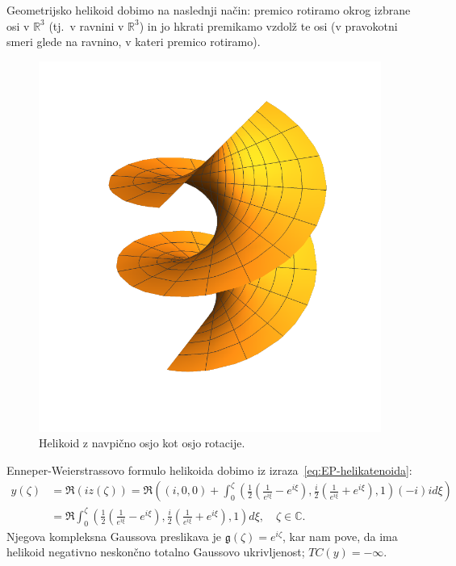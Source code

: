 \documentclass[12pt,a4paper,twoside]{article}
\theoremstyle{definition} %
\theoremstyle{plain} %
\numberwithin{equation}{section}  %
\begin{document}
Geometrijsko helikoid dobimo na naslednji način: premico rotiramo okrog izbrane osi v $\mathbb{R}^3$ (tj.~v ravnini v $\mathbb{R}^3$) in jo hkrati premikamo vzdolž te osi (v pravokotni smeri glede na ravnino, v kateri premico rotiramo).

\begin{figure}[h!]
\begin{center}
\includegraphics[scale=0.8]{images/helicoid.pdf}
\caption{Helikoid z navpično osjo kot osjo rotacije.}
\end{center}
\end{figure}

Enneper-Weierstrassovo formulo helikoida dobimo iz izraza~\eqref{eq:EP-helikatenoida}:
\begin{align}
y(\zeta) &= \Re (iz(\zeta)) = \Re \left( (i,0,0) + \int_{0}^{\zeta} \left( \frac{1}{2} \left(\frac{1}{e^{i\xi}} - e^{i\xi} \right), \frac{i}{2} \left(\frac{1}{e^{i\xi}} + e^{i\xi} \right), 1 \right) (-i) i d\xi \right) \nonumber \\
	&= \Re \int_{0}^{\zeta} \left( \frac{1}{2} \left(\frac{1}{e^{i\xi}} - e^{i\xi} \right), \frac{i}{2} \left(\frac{1}{e^{i\xi}} + e^{i\xi} \right), 1 \right) d\xi, \quad \zeta \in \mathbb{C}.
\end{align}
Njegova kompleksna Gaussova preslikava je $\mathfrak{g}(\zeta) = e^{i\zeta}$, kar nam pove, da ima helikoid negativno neskončno totalno Gaussovo ukrivljenost; $TC(y) = -\infty$. 
\end{document}
